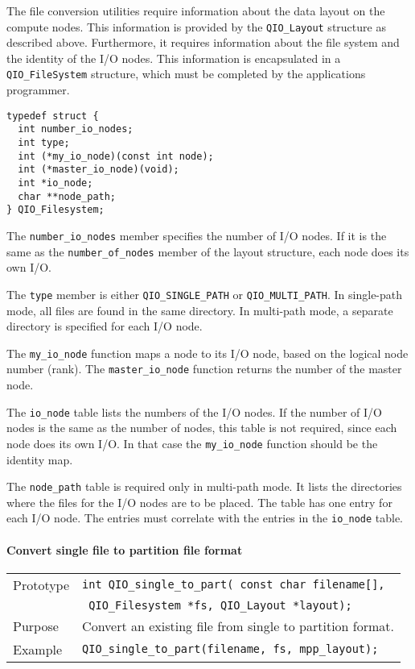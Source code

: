 \documentclass{article}
\begin{document}
The file conversion utilities require information about the data
layout on the compute nodes.  This information is provided by the
\verb|QIO_Layout| structure as described above.  Furthermore, it
requires information about the file system and the identity of the I/O
nodes.  This information is encapsulated in a \verb|QIO_FileSystem|
structure, which must be completed by the applications programmer.

%
\begin{verbatim}
typedef struct {
  int number_io_nodes;
  int type;                         
  int (*my_io_node)(const int node);
  int (*master_io_node)(void);      
  int *io_node;                     
  char **node_path;
} QIO_Filesystem;
\end{verbatim}
%

The \verb|number_io_nodes| member specifies the number of I/O nodes.
If it is the same as the \verb|number_of_nodes| member of the layout
structure, each node does its own I/O.  

The \verb|type| member is either \verb|QIO_SINGLE_PATH| or
\verb|QIO_MULTI_PATH|.  In single-path mode, all files are found in
the same directory.  In multi-path mode, a separate directory is
specified for each I/O node.

The \verb|my_io_node| function maps a node to its I/O node, based on
the logical node number (rank).  The \verb|master_io_node| function
returns the number of the master node.

The \verb|io_node| table lists the numbers of the I/O nodes.  If the
number of I/O nodes is the same as the number of nodes, this table is
not required, since each node does its own I/O.  In that case the
\verb|my_io_node| function should be the identity map.

The \verb|node_path| table is required only in multi-path mode.  It
lists the directories where the files for the I/O nodes are to be
placed.  The table has one entry for each I/O node.  The entries must
correlate with the entries in the \verb|io_node| table.

\paragraph{Convert single file to partition file format}

\begin{flushleft}
  \begin{tabular}{|l|l|}
  \hline
  Prototype      & \verb|int QIO_single_to_part( const char filename[], | \\
                 & \verb| QIO_Filesystem *fs, QIO_Layout *layout);| \\
  Purpose        & Convert an existing file from single to partition format. \\
\hline
  Example  & \verb|QIO_single_to_part(filename, fs, mpp_layout);|\\
   \hline
 \end{tabular}
\end{flushleft}
%
\end{document}
